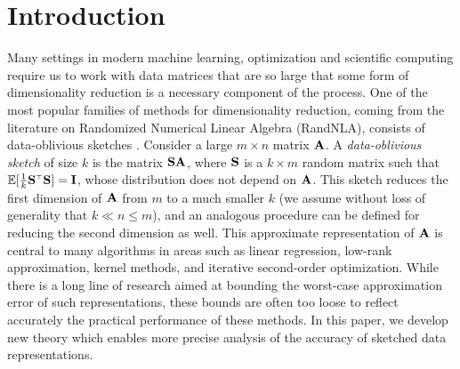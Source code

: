 \documentclass[../../thesis.tex]{subfiles}
\begin{document}
\section{Introduction}
Many settings in modern machine learning, optimization and scientific
computing require us to work with data matrices that are so large that
some form of dimensionality reduction is a necessary component of the
process. One of the most popular families of methods for dimensionality reduction,
coming from the literature on Randomized Numerical Linear Algebra
(RandNLA), consists of data-oblivious sketches \citep{Mah-mat-rev_JRNL,tropp2011structure,woodruff2014sketching}.
Consider a large $m\times n$
matrix $\A$. A \emph{data-oblivious sketch} of size $k$ is the matrix $\S\A$,
where $\S$ is a $k\times m$ random matrix such that
$\E[\frac1k\S^\top\S]=\I$, whose distribution does not
depend on $\A$. This sketch reduces the first dimension of $\A$ from
$m$ to a much smaller $k$ (we assume without loss of generality that
$k \ll n \le m$), and an analogous procedure can be defined for
reducing the second
dimension as well. This approximate representation of $\A$ is central
to many algorithms in areas such as linear regression, low-rank approximation, kernel methods,
and iterative second-order optimization. While there is a long line of research
aimed at bounding the worst-case approximation error of such
representations, these bounds are often too loose to reflect accurately
the practical performance of these methods. In this paper, we develop new theory which
enables more precise analysis of the accuracy of sketched data
representations.
\end{document}
